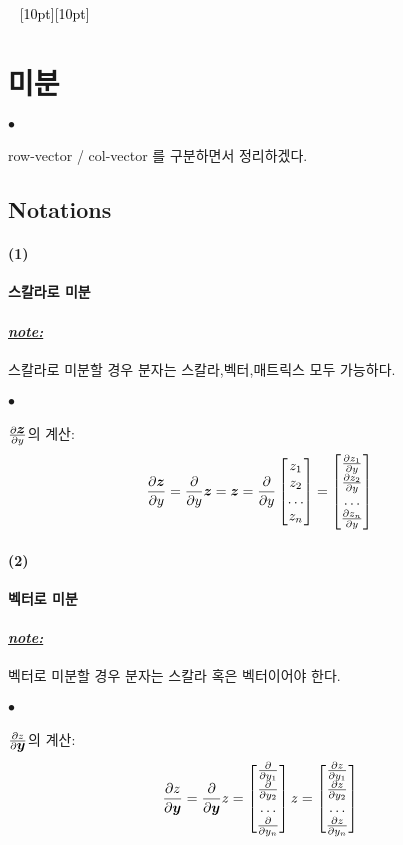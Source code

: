 \documentclass[12pt,oneside,english,a4paper]{article}
\newcommand{\dash}{\noindent \newline\textcolor{black}{\hrulefill~ \raisebox{-2.5pt}[10pt][10pt]{\leafright \decofourleft \decothreeleft  \aldineright \decotwo \floweroneleft \decoone   \floweroneright \decotwo \aldineleft\decothreeright \decofourright \leafleft} ~  \hrulefill}}
\def\ck{\paragraph{\Large$\bullet$}\Large}
\def\note{\paragraph{\Large\textit{\underline{note:}}}\Large}
\def\one{\paragraph{\Large(1)}\Large}
\def\two{\paragraph{\Large(2)}\Large}
\newcommand{\bsy}{\mbox{\boldmath $y$}}
\newcommand{\bsz}{\mbox{\boldmath $z$}}
\begin{document}
\dash

\section{미분}

\ck row-vector / col-vector 를 구분하면서 정리하겠다. 

\subsection{Notations}

\one \textbf{스칼라로 미분}

\note 스칼라로 미분할 경우 분자는 스칼라,벡터,매트릭스 모두 가능하다. 

\ck $\frac{\partial \bsz}{\partial y}$의 계산:
\[
\frac{\partial \bsz}{\partial y}=\frac{\partial}{\partial y}  \bsz=\bsz=\frac{\partial}{\partial y}\begin{bmatrix}  z_1 \\ z_2 \\ \dots  \\ z_n \end{bmatrix}=\begin{bmatrix} \frac{\partial z_1}{\partial y} \\ \frac{\partial z_2}{\partial y} \\ \dots  \\ \frac{\partial z_n}{\partial y} \end{bmatrix}
\]


\two \textbf{벡터로 미분}

\note 벡터로 미분할 경우 분자는 스칼라 혹은 벡터이어야 한다. 

\ck $\frac{\partial z}{\partial \bsy}$의 계산: 
\[
\frac{\partial z}{\partial \bsy}=\frac{\partial}{\partial \bsy}  z=\begin{bmatrix} \frac{\partial}{\partial y_1} \\ \frac{\partial}{\partial y_{2}} \\ \dots  \\ \frac{\partial}{\partial y_n} \end{bmatrix} z=\begin{bmatrix} \frac{\partial z}{\partial y_1} \\ \frac{\partial z}{\partial y_{2}} \\ \dots  \\ \frac{\partial z}{\partial y_n} \end{bmatrix}
\]
\end{document}

